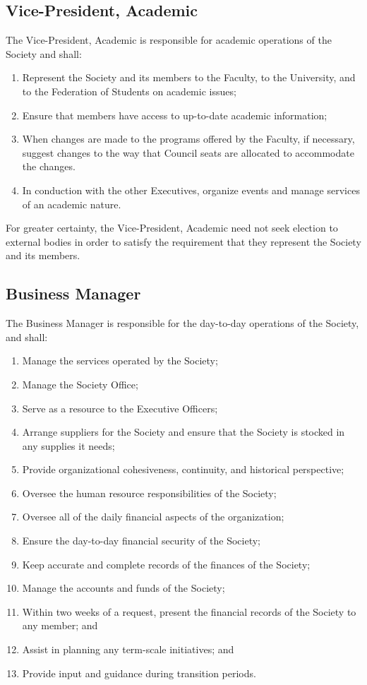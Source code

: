 \subsection{Vice-President, Academic}
The Vice-President, Academic is responsible for academic operations of the
Society and shall:
\begin{enumerate}
  \item Represent the Society and its members to the Faculty, to the University,
    and to the Federation of Students on academic issues;
  \item Ensure that members have access to up-to-date academic information;
  \item When changes are made to the programs offered by the Faculty, if
    necessary, suggest changes to the way that Council seats are allocated to
    accommodate the changes.
  \item In conduction with the other Executives, organize events and manage
    services of an academic nature.
\end{enumerate}

For greater certainty, the Vice-President, Academic need not seek election to
external bodies in order to satisfy the requirement that they represent the
Society and its members.

\subsection{Business Manager}
The Business Manager is responsible for the day-to-day operations of the 
Society, and shall:
\begin{enumerate}
    \item Manage the services operated by the Society;
    \item Manage the Society Office;
    \item Serve as a resource to the Executive Officers;
    \item Arrange suppliers for the Society and ensure that the Society is
        stocked in any supplies it needs;
    \item Provide organizational cohesiveness, continuity, and historical
        perspective;
    \item Oversee the human resource responsibilities of the Society;
    \item Oversee all of the daily financial aspects of the organization;
    \item Ensure the day-to-day financial security of the Society;
    \item Keep accurate and complete records of the finances of the Society;
    \item Manage the accounts and funds of the Society;
    \item Within two weeks of a request, present the financial records of the
        Society to any member; and
    \item Assist in planning any term-scale initiatives; and
    \item Provide input and guidance during transition periods.
\end{enumerate}

